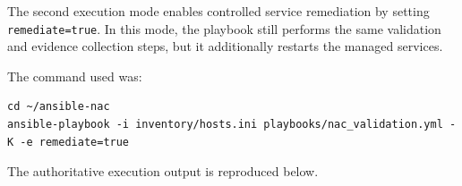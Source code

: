 \documentclass[11pt]{article}
\begin{document}
The second execution mode enables controlled service remediation by setting \texttt{remediate=true}. In this mode, the playbook still performs the same validation and evidence collection steps, but it additionally restarts the managed services.

The command used was:

\begin{verbatim}
cd ~/ansible-nac
ansible-playbook -i inventory/hosts.ini playbooks/nac_validation.yml -K -e remediate=true
\end{verbatim}

The authoritative execution output is reproduced below.

\end{document}
